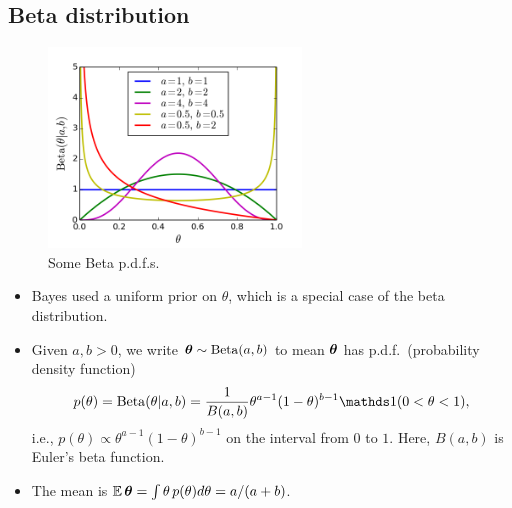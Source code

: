 \documentclass[12pt]{article}
\begin{document}
\subsection{Beta distribution}

\begin{figure}
  \begin{center}
    \includegraphics[width=0.6\textwidth]{Beta.png}
  \end{center}
  \caption{Some Beta p.d.f.s.}
\end{figure}


\begin{itemize}
\item Bayes used a uniform prior on $\theta$, which is a special case of the beta distribution.
\item Given $a,b>0$, we write ${\bm\theta}\sim\operatorname*{Beta}(a,b)$ to mean ${\bm\theta}$ has p.d.f.\ (probability density function)
\begin{align}\label{equation:beta}
p(\theta) =\Beta(\theta|a,b) =\frac{1}{B(a,b)}\theta^{a-1}(1-\theta)^{b-1}\I(0<\theta<1),
\end{align}
i.e., $p(\theta)\propto \theta^{a-1}(1-\theta)^{b-1}$ on the interval from $0$ to $1$. Here, $B(a,b)$ is Euler's beta function.
\item The mean is $\mathbb{E}\,{\bm\theta} =\int \theta\,p(\theta)d\theta = a/(a+b)$.
\end{itemize}
\end{document}
